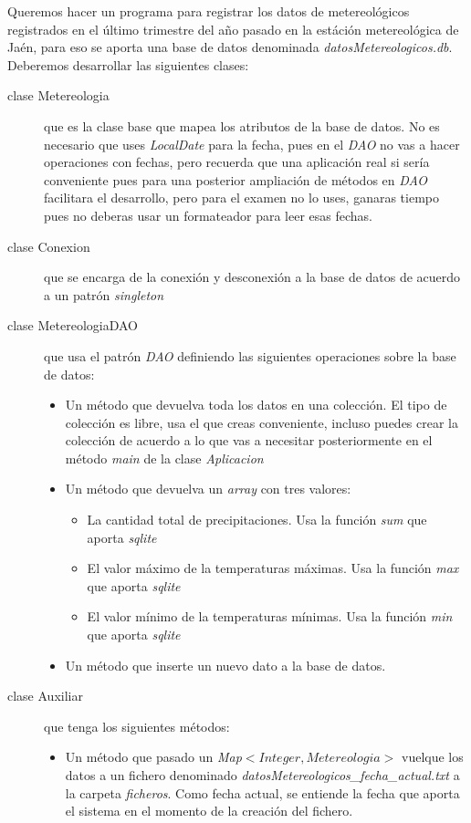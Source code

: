 \documentclass[addpoints,12pt]{exam}
\begin{document}
\begin{questions}
\question Queremos hacer un programa para registrar los datos de metereológicos registrados en el último trimestre del año pasado en la estáción metereológica de Jaén, para eso se aporta una base de datos denominada \emph{datosMetereologicos.db}. Deberemos desarrollar las siguientes clases:
\begin{description}
\item[clase Metereologia] que es la clase base que mapea los atributos de la base de datos. No es necesario que uses \emph{LocalDate} para la fecha, pues en el \emph{DAO} no vas a hacer operaciones con fechas, pero recuerda que una aplicación real si sería conveniente pues para una posterior ampliación de métodos en \emph{DAO} facilitara el desarrollo, pero para el examen no lo uses, ganaras tiempo pues no deberas usar un formateador para leer esas fechas. 
\item[clase Conexion] que se encarga de la conexión y desconexión a la base de datos de acuerdo a un patrón \emph{singleton}
\item[clase MetereologiaDAO] que usa el patrón \emph{DAO} definiendo las siguientes operaciones sobre la base de datos:
\begin{itemize}
\item Un método que devuelva toda los datos en una colección. El tipo de colección es libre, usa el que creas conveniente, incluso puedes crear la colección de acuerdo a lo que vas a necesitar posteriormente en el método \emph{main} de la clase \emph{Aplicacion}
\item Un método que devuelva un \emph{array} con tres valores:
\begin{itemize}
\item La cantidad total de precipitaciones. Usa la función \emph{sum} que aporta \emph{sqlite}
\item El valor máximo de la temperaturas máximas. Usa la función \emph{max} que aporta \emph{sqlite}
\item El valor mínimo de la temperaturas mínimas. Usa la función \emph{min} que aporta \emph{sqlite}
\end{itemize}
\item Un método que inserte un nuevo dato a la base de datos.
\end{itemize}
\item[clase Auxiliar] que tenga los siguientes métodos:
\begin{itemize}
\item Un método que pasado un \emph{Map$<Integer,Metereologia>$} vuelque los datos a un fichero denominado \emph{datosMetereologicos\_fecha\_actual.txt} a la carpeta \emph{ficheros}. Como fecha actual, se entiende la fecha que aporta el sistema en el momento de la creación del fichero.

\end{itemize}
\end{description}
\end{questions}
\end{document}
